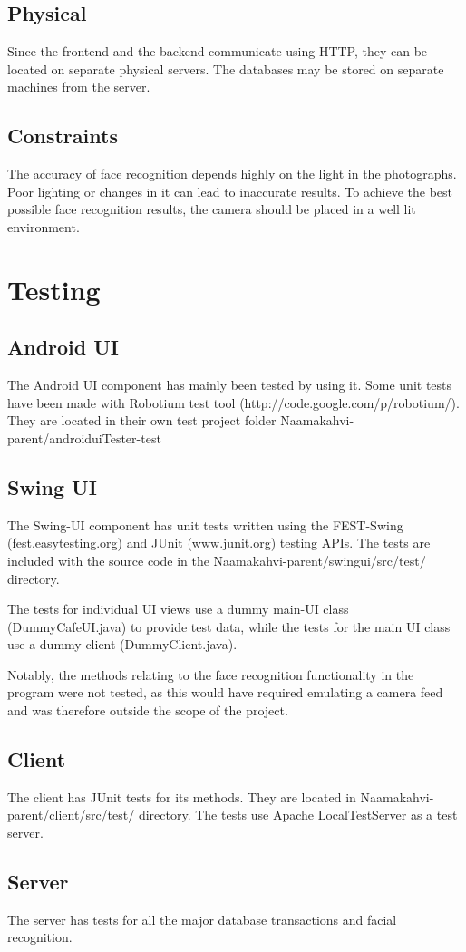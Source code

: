 \documentclass[11pt]{article}
\begin{document}
\subsection{Physical}

Since the frontend and the backend communicate using HTTP, they can be
located on separate physical servers. The databases may be stored on separate
machines from the server.

\subsection{Constraints}
The accuracy of face recognition depends highly on the light in the 
photographs. Poor lighting or changes in it can lead to inaccurate results.
To achieve the best possible face recognition results, the camera should be 
placed in a well lit environment.

\section{Testing}

\subsection{Android UI}
The Android UI component has mainly been tested by using it. Some unit tests have been made
with Robotium test tool (http://code.google.com/p/robotium/). They are located in their own
test project folder Naamakahvi-parent/androiduiTester-test

\subsection{Swing UI}
The Swing-UI component has unit tests written using the FEST-Swing (fest.easytesting.org)
and JUnit (www.junit.org) testing APIs. The tests are included with the source code in the
Naamakahvi-parent/swingui/src/test/ directory. 

The tests for individual UI views use a dummy main-UI class (DummyCafeUI.java) to provide
test data, while the tests for the main UI class use a dummy client (DummyClient.java).

Notably, the methods relating to the face recognition functionality in the program were
not tested, as this would have required emulating a camera feed and was therefore outside
the scope of the project.

\subsection{Client}
The client has JUnit tests for its methods. They are located in Naamakahvi-parent/client/src/test/
directory. The tests use Apache LocalTestServer as a test server.

\subsection{Server}
The server has tests for all the major database transactions and facial recognition.
\end{document}
